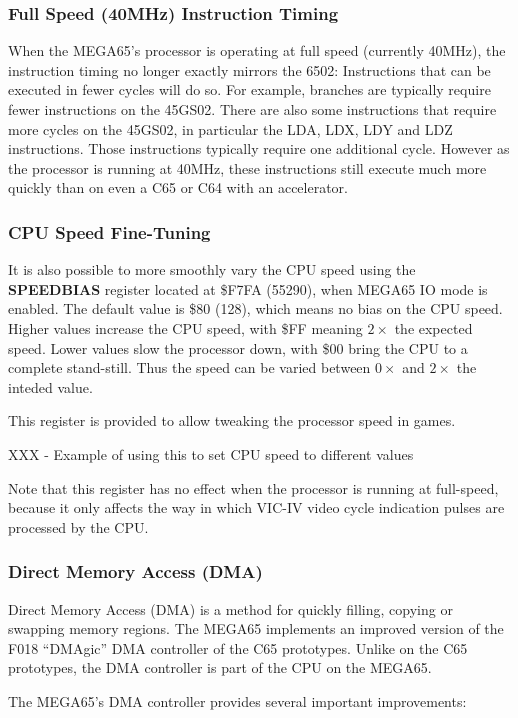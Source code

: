 \subsubsection{Full Speed (40MHz) Instruction Timing}

When the MEGA65's processor is operating at full speed (currently 40MHz), the instruction
timing no longer exactly mirrors the 6502: Instructions that can be executed in fewer cycles
will do so. For example, branches are typically require fewer instructions on the 45GS02.
There are also some instructions that require more cycles on the 45GS02, in particular the
LDA, LDX, LDY and LDZ instructions. Those instructions typically require one additional cycle.
However as the processor is running at 40MHz, these instructions still execute much more quickly
than on even a C65 or C64 with an accelerator.

\subsubsection{CPU Speed Fine-Tuning}
It is also possible to more smoothly
vary the CPU speed using the {\bf SPEEDBIAS} register located at \$F7FA (55290), when MEGA65 IO mode
is enabled.  The default value is \$80 (128), which means no bias on the CPU speed.  Higher values
increase the CPU speed, with \$FF meaning $2\times$ the expected speed. Lower values slow
the processor down, with \$00 bring the CPU to a complete stand-still.  Thus the speed can be
varied between $0\times$ and $2\times$ the inteded value.

This register is provided to allow tweaking the processor speed in games.

XXX - Example of using this to set CPU speed to different values

Note that this register has no effect when
the processor is running at full-speed, because it only affects the way in which VIC-IV
video cycle indication pulses are processed by the CPU.  

\subsubsection{Direct Memory Access (DMA)}
Direct Memory Access (DMA) is a method for quickly filling, copying or swapping memory regions.
The MEGA65 implements an improved version of the F018 ``DMAgic'' DMA controller of the C65 prototypes.
Unlike on the C65 prototypes, the DMA controller is part of the CPU on the MEGA65.

The MEGA65's DMA controller provides several important improvements:

